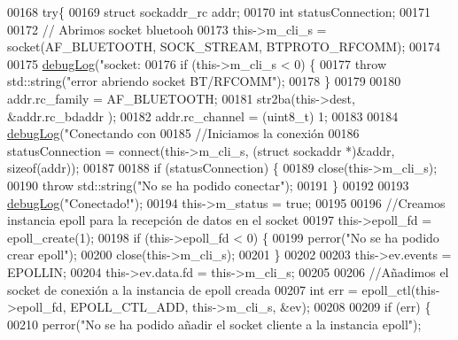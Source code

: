 \begin{DoxyCode}
{{{{00168         \textcolor{keywordflow}{try}\{
00169             \textcolor{keyword}{struct }sockaddr\_rc addr;
00170             \textcolor{keywordtype}{int} statusConnection;
00171 
00172             \textcolor{comment}{// Abrimos socket bluetooh}
00173             this->m\_cli\_s = socket(AF\_BLUETOOTH, SOCK\_STREAM, BTPROTO\_RFCOMM);
00174 
00175             \hyperlink{debug_8hpp_a55f41cf7b0585224496de3d7adbc101c}{debugLog}(\textcolor{stringliteral}{"socket: %
00176             \textcolor{keywordflow}{if} (this->m\_cli\_s < 0) \{
00177                 \textcolor{keywordflow}{throw} std::string(\textcolor{stringliteral}{"error abriendo socket BT/RFCOMM"});
00178             \}
00179 
00180             addr.rc\_family = AF\_BLUETOOTH;
00181             str2ba(this->dest, &addr.rc\_bdaddr );
00182             addr.rc\_channel = (uint8\_t) 1;
00183 
00184             \hyperlink{debug_8hpp_a55f41cf7b0585224496de3d7adbc101c}{debugLog}(\textcolor{stringliteral}{"Conectando con %
00185             \textcolor{comment}{//Iniciamos la conexión}
00186             statusConnection = connect(this->m\_cli\_s, (\textcolor{keyword}{struct} sockaddr *)&addr, \textcolor{keyword}{sizeof}(addr));
00187 
00188             \textcolor{keywordflow}{if} (statusConnection) \{
00189                 close(this->m\_cli\_s);
00190                 \textcolor{keywordflow}{throw} std::string(\textcolor{stringliteral}{"No se ha podido conectar"});
00191             \}
00192 
00193             \hyperlink{debug_8hpp_a55f41cf7b0585224496de3d7adbc101c}{debugLog}(\textcolor{stringliteral}{"Conectado!"});
00194             this->m\_status = \textcolor{keyword}{true};
00195 
00196             \textcolor{comment}{//Creamos instancia epoll para la recepción de datos en el socket}
00197             this->epoll\_fd = epoll\_create(1);
00198             \textcolor{keywordflow}{if} (this->epoll\_fd < 0) \{
00199                 perror(\textcolor{stringliteral}{"No se ha podido crear epoll"});
00200                 close(this->m\_cli\_s);
00201             \}
00202 
00203             this->ev.events = EPOLLIN;
00204             this->ev.data.fd = this->m\_cli\_s;
00205 
00206             \textcolor{comment}{//Añadimos el socket de conexión a la instancia de epoll creada}
00207             \textcolor{keywordtype}{int} err = epoll\_ctl(this->epoll\_fd, EPOLL\_CTL\_ADD, this->m\_cli\_s, &ev);
00208             
00209             \textcolor{keywordflow}{if} (err) \{
00210                 perror(\textcolor{stringliteral}{"No se ha podido añadir el socket cliente a la instancia epoll"});
}}}}}}
\end{DoxyCode}
